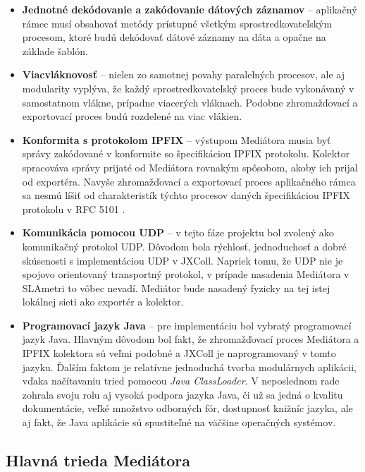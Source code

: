\begin{itemize}
 \item \textbf{Jednotné dekódovanie a zakódovanie dátových záznamov} -- aplikačný rámec musí obsahovať metódy 
 prístupné všetkým sprostredkovateľským procesom, ktoré budú dekódovať dátové záznamy na dáta a opačne
 na základe šablón.
 
 \item \textbf{Viacvláknovosť} -- nielen zo samotnej povahy paralelných procesov, ale aj modularity vyplýva, 
 že každý sprostredkovateľský proces bude vykonávaný v samostatnom vlákne, prípadne viacerých vláknach. 
 Podobne zhromažďovací a exportovací proces budú rozdelené na viac vlákien. 
 
 \item \textbf{Konformita s protokolom IPFIX} -- výstupom Mediátora musia byť správy zakódované 
 v konformite so špecifikáciou IPFIX protokolu. Kolektor spracováva správy prijaté od Mediátora rovnakým
 spôsobom, akoby ich prijal od exportéra. Navyše zhromažďovací a exportovací proces aplikačného rámca sa 
 nesmú líšiť od charakteristík týchto procesov daných špecifikáciou IPFIX protokolu v RFC 
 5101 \citep{rfc5101}.
 
 \item \textbf{Komunikácia pomocou UDP} -- v tejto fáze projektu bol zvolený ako komunikačný protokol UDP.
 Dôvodom bola rýchlosť, jednoduchosť a dobré skúsenosti s implementáciou UDP v JXColl. Napriek tomu, že 
 UDP nie je  spojovo orientovaný transportný protokol, v prípade nasadenia Mediátora v SLAmetri to vôbec
 nevadí. Mediátor bude nasadený fyzicky na tej istej lokálnej sieti ako exportér a kolektor. 
 
 \item \textbf{Programovací jazyk Java} -- pre implementáciu bol vybratý programovací jazyk Java.
 Hlavným dôvodom bol fakt, že zhromažďovací proces Mediátora a IPFIX kolektora sú veľmi podobné a JXColl 
 je naprogramovaný v tomto jazyku. Ďalším faktom je relatívne jednoduchá tvorba modulárnych aplikácii,
 vďaka načítavaniu tried pomocou \emph{Java ClassLoader}. V neposlednom rade zohrala svoju rolu aj vysoká
 podpora jazyka Java, či už sa jedná o kvalitu dokumentácie, veľké množstvo odborných fór, dostupnosť 
 knižníc jazyka, ale aj fakt, že Java aplikácie sú spustiteľné na väčšine operačných systémov.
\end{itemize}


\subsection{Hlavn\'a trieda Medi\'atora}


